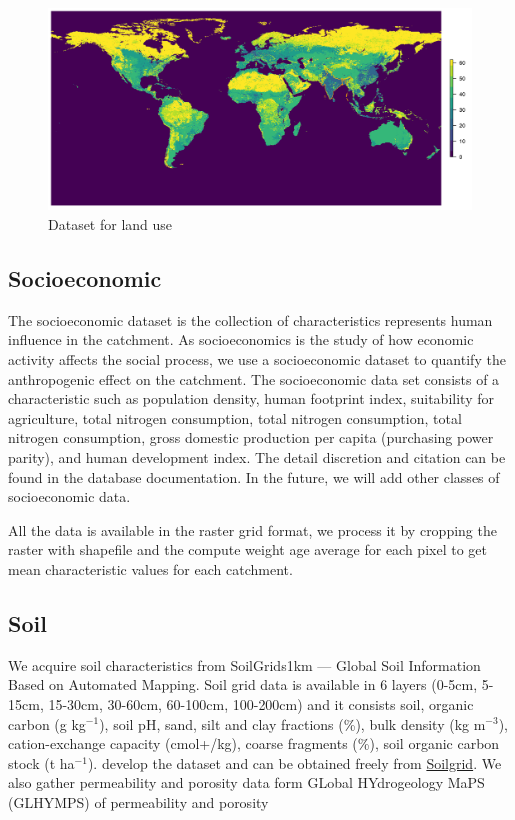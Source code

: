 \documentclass[a4paper, 12pt]{article}
\begin{document}
\begin{figure}[!h]
\includegraphics[width = 1\textwidth]{Figures/LU.png}
\caption{Dataset for land use}
\end{figure}

\subsection{Socioeconomic}
The socioeconomic dataset is the collection of characteristics represents human influence in the catchment. As socioeconomics is the study of how economic activity affects the social process, we use a socioeconomic dataset to quantify the anthropogenic effect on the catchment. The socioeconomic data set consists of a characteristic such as population density, human footprint index, suitability for agriculture, total nitrogen consumption, total nitrogen consumption, total nitrogen consumption, gross domestic production per capita (purchasing power parity), and human development index. The detail discretion and citation can be found in the database documentation. In the future, we will add other classes of socioeconomic data.

All the data is available in the raster grid format, we process it by cropping the raster with shapefile and the compute weight age average for each pixel to get mean characteristic values for each catchment.  

\subsection{Soil} 
We acquire soil characteristics from SoilGrids1km — Global Soil Information Based on Automated Mapping. Soil grid data is available in 6 layers (0-5cm, 5-15cm, 15-30cm, 30-60cm, 60-100cm, 100-200cm) and it consists soil, organic carbon (g kg$^{-1}$), soil pH, sand, silt and clay fractions (\%), bulk density (kg m$^{−3}$), cation-exchange capacity (cmol+/kg), coarse fragments (\%), soil organic carbon stock (t ha$^{−1}$). \citet{hengl2014soilgrids1km} develop the dataset and can be obtained freely from \href{https://soilgrids.org/}{Soilgrid}. We also gather permeability and porosity data form GLobal HYdrogeology MaPS (GLHYMPS) of permeability and porosity \citep{gleeson2014glimpse}
\end{document}
